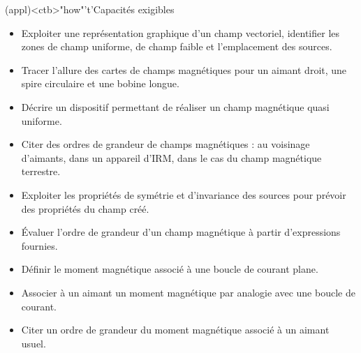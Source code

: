 \documentclass[../../main/main.tex]{subfiles}
\begin{document}
\begin{tcn}[sidebyside, fontupper=\small, fontlower=\small](appl)<ctb>"how"'t'{Capacités exigibles}
	\begin{itemize}[label=\rcheck]
		\item Exploiter une représentation graphique d'un champ vectoriel,
		      identifier les zones de champ uniforme, de champ faible et l'emplacement
		      des sources.

		\item Tracer l'allure des cartes de champs magnétiques pour un aimant droit,
		      une spire circulaire et une bobine longue.

		\item Décrire un dispositif permettant de réaliser un champ magnétique quasi
		      uniforme.

		\item Citer des ordres de grandeur de champs magnétiques : au voisinage
		      d'aimants, dans un appareil d'IRM, dans le cas du champ magnétique
		      terrestre.
	\end{itemize}
	\tcblower
	\begin{itemize}[label=\rcheck]
		\item Exploiter les propriétés de symétrie et d'invariance des sources pour
		      prévoir des propriétés du champ créé.

		\item Évaluer l'ordre de grandeur d'un champ magnétique à partir
		      d'expressions fournies.

		\item Définir le moment magnétique associé à une boucle de courant plane.

		\item Associer à un aimant un moment magnétique par analogie avec une boucle
		      de courant.

		\item Citer un ordre de grandeur du moment magnétique associé à un aimant
		      usuel.
	\end{itemize}
\end{tcn}

\vspace*{\fill}

\newpage
\end{document}
